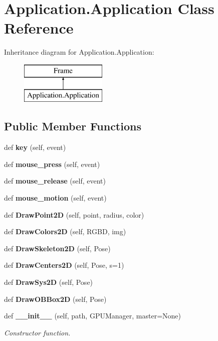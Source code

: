 \section{Application.\+Application Class Reference}
\label{class_application_1_1_application}
Inheritance diagram for Application.\+Application\+:\begin{figure}[H]
\begin{center}
\leavevmode
\includegraphics[height=2.000000cm]{class_application_1_1_application}
\end{center}
\end{figure}
\subsection*{Public Member Functions}
\begin{DoxyCompactItemize}
\item 
def \textbf{ key} (self, event)
\item 
def \textbf{ mouse\+\_\+press} (self, event)
\item 
def \textbf{ mouse\+\_\+release} (self, event)
\item 
def \textbf{ mouse\+\_\+motion} (self, event)
\item 
def \textbf{ Draw\+Point2D} (self, point, radius, color)
\item 
def \textbf{ Draw\+Colors2D} (self, R\+G\+BD, img)
\item 
def \textbf{ Draw\+Skeleton2D} (self, Pose)
\item 
def \textbf{ Draw\+Centers2D} (self, Pose, s=1)
\item 
def \textbf{ Draw\+Sys2D} (self, Pose)
\item 
def \textbf{ Draw\+O\+B\+Box2D} (self, Pose)
\item 
def \textbf{ \+\_\+\+\_\+init\+\_\+\+\_\+} (self, path, G\+P\+U\+Manager, master=None)
\begin{DoxyCompactList}\small\item\em Constructor function. \end{DoxyCompactList}\end{DoxyCompactItemize}
